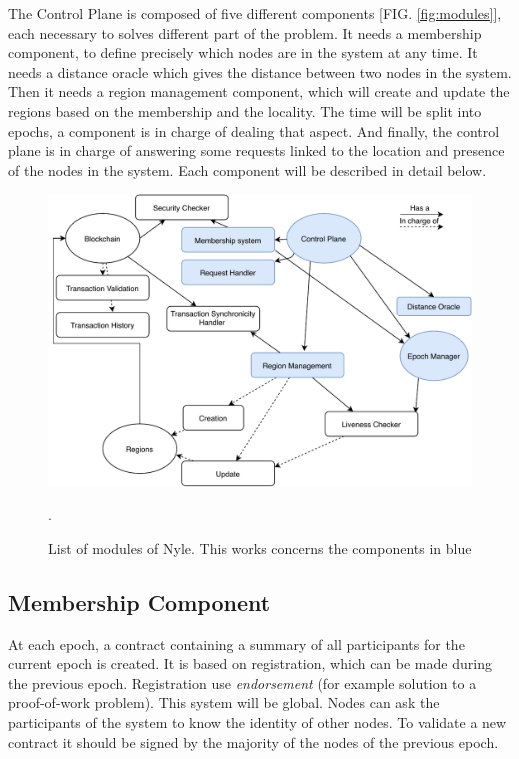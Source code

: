 \documentclass[a4paper,11pt,oneside]{report}
\begin{document}
The Control Plane is composed of five different components [FIG.
\autoref{fig:modules}], each necessary to solves different part of the problem.
It needs a membership component, to define precisely which nodes are in the
system at any time. It needs a distance oracle which gives the distance between
two nodes in the system. Then it needs a region management component, which
will create and update the regions based on the membership and the locality.
The time will be split into epochs, a component is in charge of dealing that
aspect. And finally, the control plane is in charge of answering some requests
linked to the location and presence of the nodes in the system. Each component
will be described in detail below. 

\begin{figure}[!h]
\centering
\includegraphics[width=400pt]{figures/Nyle_components}
\caption{List of modules of Nyle. This works concerns the components in blue}.
\label{fig:modules}
\end{figure}

\subsection{Membership Component}

At each epoch, a contract containing a summary of all participants for the
current epoch is created. It is based on registration, which can be made during
the previous epoch. Registration use \textit{endorsement} (for example solution
to a proof-of-work problem). This system will be global. Nodes can ask the
participants of the system to know the identity of other nodes. To validate a
new contract it should be signed by the majority of the nodes of the previous
epoch.
\end{document}

